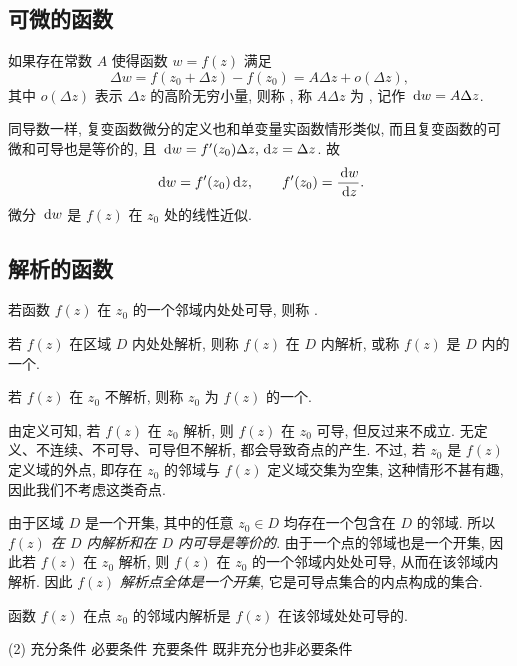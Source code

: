 \subsection{可微的函数}


\begin{definition}
  如果存在常数 $A$ 使得函数 $w=f(z)$ 满足
    \[\Delta w=f(z_0+\Delta z)-f(z_0)=A\Delta z+o(\Delta z),\]
  其中 $o(\Delta z)$ 表示 $\Delta z$ 的高阶无穷小量,
  则称 , 称 $A\Delta z$ 为 , 记作 $\,\mathrm{d} w=A \Delta z$.
\end{definition}

同导数一样, 复变函数微分的定义也和单变量实函数情形类似, 而且复变函数的可微和可导也是等价的, 且 $\,\mathrm{d} w=f'(z_0)\Delta z, \,\mathrm{d} z=\Delta z$.
故
  \[\,\mathrm{d} w=f'(z_0)\,\mathrm{d} z,\qquad f'(z_0)=\dfrac{\,\mathrm{d} w}{\,\mathrm{d} z}.\]
微分 $\,\mathrm{d} w$ 是 $f(z)$ 在 $z_0$ 处的线性近似.

\subsection{解析的函数}

\begin{definition}
  \begin{enumpar}
    \item 若函数 $f(z)$ 在 $z_0$ 的一个邻域内处处可导, 则称 .
    \item 若 $f(z)$ 在区域 $D$ 内处处解析, 则称 $f(z)$ 在 $D$ 内解析, 或称 $f(z)$ 是 $D$ 内的一个\footnotemark.
    \item 若 $f(z)$ 在 $z_0$ 不解析, 则称 $z_0$ 为 $f(z)$ 的一个.
  \end{enumpar}
\end{definition}
由定义可知, 若 $f(z)$ 在 $z_0$ 解析, 则 $f(z)$ 在 $z_0$ 可导, 但反过来不成立.
无定义、不连续、不可导、可导但不解析, 都会导致奇点的产生.
不过, 若 $z_0$ 是 $f(z)$ 定义域的外点, 即存在 $z_0$ 的邻域与 $f(z)$ 定义域交集为空集, 这种情形不甚有趣, 因此我们不考虑这类奇点.

由于区域 $D$ 是一个开集, 其中的任意 $z_0\in D$ 均存在一个包含在 $D$ 的邻域. 所以 \emph{$f(z)$ 在 $D$ 内解析和在 $D$ 内可导是等价的}.
由于一个点的邻域也是一个开集, 因此若 $f(z)$ 在 $z_0$ 解析, 则 $f(z)$ 在 $z_0$ 的一个邻域内处处可导, 从而在该邻域内解析. 因此 \emph{$f(z)$ 解析点全体是一个开集}, 它是可导点集合的内点构成的集合.

\begin{exercise}
  函数 $f(z)$ 在点 $z_0$ 的邻域内解析是 $f(z)$ 在该邻域处处可导的\fillbrace{}.
  \begin{taskschoice}(2)
    \task 充分条件
    \task 必要条件
    \task 充要条件
    \task 既非充分也非必要条件
  \end{taskschoice}
\end{exercise}


